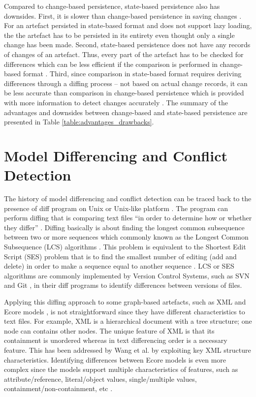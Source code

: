 Compared to change-based persistence, state-based persistence also has  downsides. First, it is slower than change-based persistence in saving changes \cite{mens2002state}. For an artefact persisted in state-based format and does not support lazy loading, the the artefact has to be persisted in its entirety even thought only a single change has been made. Second, state-based persistence does not have any records of changes of an artefact. Thus, every part of the artefact has to be checked for differences which can be less efficient if the comparison is performed in change-based format \cite{DBLP:conf/edoc/KoegelHLHD10}. Third, since comparison in state-based format requires deriving differences through a diffing process -- not based on actual change records, it can be less accurate than comparison in change-based persistence which is provided with more information to detect changes accurately \cite{mens2002state,DBLP:conf/edoc/KoegelHLHD10}. The summary of the advantages and downsides between change-based and state-based persistence are presented in Table \ref{table:advantages_drawbacks}.

\section{Model Differencing and Conflict Detection}
\label{sec:model_differencing_and_conflict_detection}
The history of model differencing and conflict detection can be traced back to the presence of \textsf{diff} program on Unix or Unix-like platform \cite{hunt1976algorithm}. The program can perform diffing that is comparing text files ``in order to determine how or whether they differ'' \cite{diff}. Diffing basically is about finding the longest common subsequence between two or more sequences which commonly known as the Longest Common Subsequence (LCS) algorithms \cite{bergroth2000lcs}. This problem is equivalent to the Shortest Edit Script (SES) problem that is to find the smallest number of editing (add and delete) in order to make a sequence equal to another sequence \cite{DBLP:journals/algorithmica/Meyers86}. LCS or SES algorithms are commonly implemented by Version Control Systems, such as SVN \cite{svn-diff} and Git \cite{git-diff}, in their \textsf{diff} programs to identify differences between versions of files.   

Applying this diffing approach to some graph-based artefacts, such as XML \cite{w3c-xml} and Ecore models \cite{steinberg2008emf}, is not straightforward since they have different characteristics to text files. For example, XML is a hierarchical document with a tree structure; one node can contains other nodes. The unique feature of XML is that its containment is  unordered whereas in text differencing order is a necessary feature. This has been addressed by Wang et al. \cite{wang2003xdiff} by exploiting key XML  structure characteristics. Identifying differences between Ecore models is even more complex since the models support multiple characteristics of features, such as attribute/reference, literal/object values, single/multiple values, containment/non-containment, etc \cite{steinberg2008emf}. 

